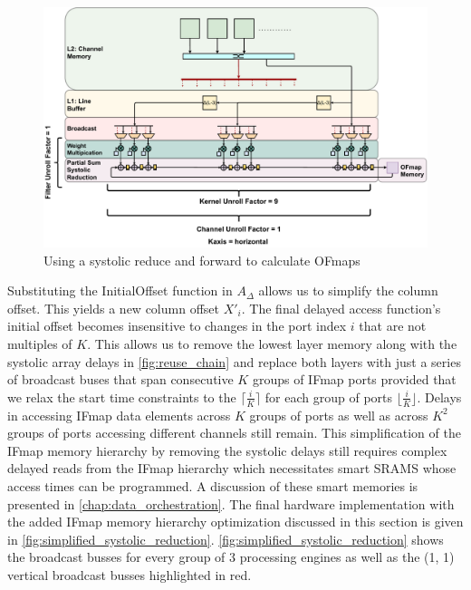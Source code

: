\begin{figure}[]
    \centering
    \includegraphics[scale=0.36]{fig/hybrid3x3Gemm.pdf}
    \caption{Using a systolic reduce and forward to calculate OFmaps}
    \label{fig:simplified_systolic_reduction}
\end{figure}

Substituting the InitialOffset function in $A_\Delta$  allows us to simplify the
column offset. This yields a new column offset $X'_i$. The final delayed access
function's initial offset becomes insensitive to changes in the port index $i$
that are not multiples of $K$. This allows us to remove the lowest layer memory
along with the systolic array delays in \autoref{fig:reuse_chain} and replace
both layers with just a series of broadcast buses that span consecutive $K$
groups of IFmap ports provided that we relax the start time constraints to the
$\lceil \frac{i}{K} \rceil$ for each group of ports $\lfloor \frac{i}{K}
\rfloor$. Delays in accessing IFmap data elements across $K$ groups of ports as
well as across $K^2$ groups of ports accessing different channels still remain.
This simplification of the IFmap memory hierarchy by removing the systolic
delays still requires complex delayed reads from the IFmap hierarchy which
necessitates smart SRAMS whose access times can be programmed. A discussion of
these smart memories is presented in \autoref{chap:data_orchestration}. The
final hardware implementation with the added IFmap memory hierarchy optimization
discussed in this section is given in
\autoref{fig:simplified_systolic_reduction}.
\autoref{fig:simplified_systolic_reduction} shows the broadcast busses for every
group of 3 processing engines as well as the (1, 1) vertical broadcast busses
highlighted in red. 


